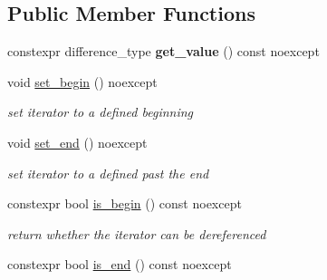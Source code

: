 \subsection*{Public Member Functions}
\begin{DoxyCompactItemize}
\item 
constexpr difference\+\_\+type {\bfseries get\+\_\+value} () const noexcept\hypertarget{classnlohmann_1_1detail_1_1primitive__iterator__t_ae952990886ca1756229f916661a8af81}{}\label{classnlohmann_1_1detail_1_1primitive__iterator__t_ae952990886ca1756229f916661a8af81}

\item 
void \hyperlink{classnlohmann_1_1detail_1_1primitive__iterator__t_a9d9b005906106e12aed738f97d7fee42}{set\+\_\+begin} () noexcept\hypertarget{classnlohmann_1_1detail_1_1primitive__iterator__t_a9d9b005906106e12aed738f97d7fee42}{}\label{classnlohmann_1_1detail_1_1primitive__iterator__t_a9d9b005906106e12aed738f97d7fee42}

\begin{DoxyCompactList}\small\item\em set iterator to a defined beginning \end{DoxyCompactList}\item 
void \hyperlink{classnlohmann_1_1detail_1_1primitive__iterator__t_ad26a823483846a12d890c3feed3097eb}{set\+\_\+end} () noexcept\hypertarget{classnlohmann_1_1detail_1_1primitive__iterator__t_ad26a823483846a12d890c3feed3097eb}{}\label{classnlohmann_1_1detail_1_1primitive__iterator__t_ad26a823483846a12d890c3feed3097eb}

\begin{DoxyCompactList}\small\item\em set iterator to a defined past the end \end{DoxyCompactList}\item 
constexpr bool \hyperlink{classnlohmann_1_1detail_1_1primitive__iterator__t_a8d1a7d46b3fcd06edd034f04ededb5e4}{is\+\_\+begin} () const noexcept\hypertarget{classnlohmann_1_1detail_1_1primitive__iterator__t_a8d1a7d46b3fcd06edd034f04ededb5e4}{}\label{classnlohmann_1_1detail_1_1primitive__iterator__t_a8d1a7d46b3fcd06edd034f04ededb5e4}

\begin{DoxyCompactList}\small\item\em return whether the iterator can be dereferenced \end{DoxyCompactList}\item 
constexpr bool \hyperlink{classnlohmann_1_1detail_1_1primitive__iterator__t_a45a7e301c23b5b90417baf2277f40b1d}{is\+\_\+end} () const noexcept\hypertarget{classnlohmann_1_1detail_1_1primitive__iterator__t_a45a7e301c23b5b90417baf2277f40b1d}{}\label{classnlohmann_1_1detail_1_1primitive__iterator__t_a45a7e301c23b5b90417baf2277f40b1d}


\end{DoxyCompactItemize}
